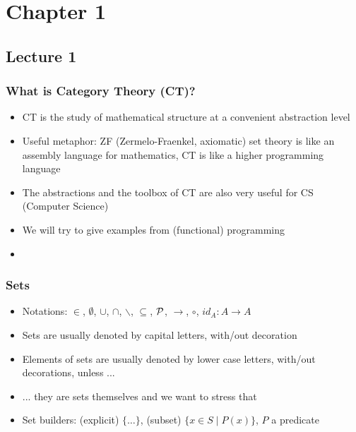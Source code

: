 \documentclass[handout]{beamer}
\title[INF210 presentations]{}
\begin{document}
\section{Chapter 1}
\subsection{Lecture 1}
 
\frame
  {   
    \frametitle{What is Category Theory (CT)?}\label{Ch1:What is CT}

 \begin{itemize}[<+->]
\item CT is the study of mathematical structure at a convenient abstraction level
\item Useful metaphor: ZF (Zermelo-Fraenkel, axiomatic) set theory is like an assembly language for mathematics, CT is like a higher programming language
\item The abstractions and the toolbox of CT are also very useful for CS (Computer Science)
\item We will try to give examples from (functional) programming
\item 
 
 \end{itemize}

 }

\frame
  {   
    \frametitle{Sets}\label{Ch1:sets}

 \begin{itemize}[<+->]
\item Notations: $\in$, $\emptyset$, $\cup$, $\cap$, $\backslash$, 
$\subseteq$, $\operatorname{\mathcal{P}}$, $\to$, $\circ$, $id_A : A\to A$
\item Sets are usually denoted by capital letters, with/out decoration
\item Elements of sets are usually denoted by lower case letters, with/out decorations, unless ...
\item ...  they are sets themselves and we want to stress that
\item Set builders: (explicit) $\{ \ldots \}$,  (subset) $\{x \in S \mid P(x) \}$, $P$ a predicate
 \end{itemize}

 }
\end{document}
